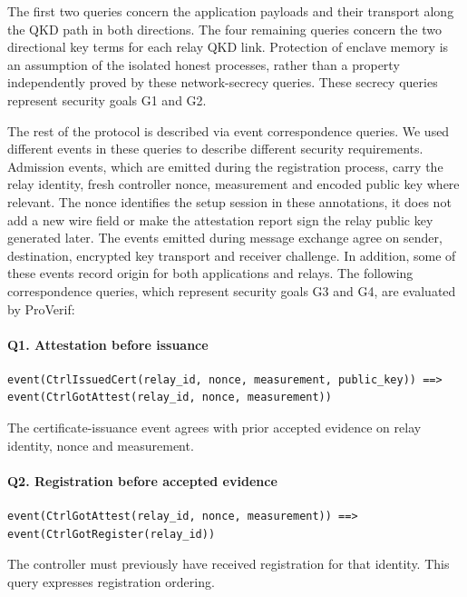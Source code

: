 \documentclass[futureinternet,article,submit,moreauthors]{Definitions/mdpi}
\begin{document}
The first two queries concern the application payloads and their transport along the QKD path in both directions. The four remaining queries concern the two directional key terms for each relay QKD link. Protection of enclave memory is an assumption of the isolated honest processes, rather than a property independently proved by these network-secrecy queries. These secrecy queries represent security goals G1 and G2.

The rest of the protocol is described via event correspondence queries. We used different events in these queries to describe different security requirements. Admission events, which are emitted during the registration process, carry the relay identity, fresh controller nonce, measurement and encoded public key where relevant. The nonce identifies the setup session in these annotations, it does not add a new wire field or make the attestation report sign the relay public key generated later. The events emitted during message exchange agree on sender, destination, encrypted key transport and receiver challenge. In addition, some of these events record origin for both applications and relays. The following correspondence queries, which represent security goals G3 and G4, are evaluated by ProVerif:

\paragraph{Q1. Attestation before issuance}

\begin{lstlisting}
event(CtrlIssuedCert(relay_id, nonce, measurement, public_key)) ==> event(CtrlGotAttest(relay_id, nonce, measurement))
\end{lstlisting}

The certificate-issuance event agrees with prior accepted evidence on relay identity, nonce and measurement.

\paragraph{Q2. Registration before accepted evidence}

\begin{lstlisting}
event(CtrlGotAttest(relay_id, nonce, measurement)) ==> event(CtrlGotRegister(relay_id))
\end{lstlisting}

The controller must previously have received registration for that identity. This query expresses registration ordering.
\end{document}
